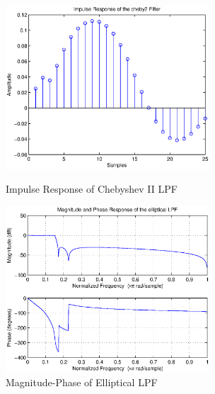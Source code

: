 \documentclass{article}
\begin{document}
\begin{figure}[ht]
\begin{minipage}[b]{0.5\linewidth}
\centering
\includegraphics[width=3in]{project6_09.eps}
\caption{Impulse Response of  Chebyshev II LPF}
\label{fig:figure9}
\end{minipage}
\hspace{0.5cm}
\begin{minipage}[b]{0.5\linewidth}
\centering
\includegraphics[width=3in]{project6_10.eps}
\caption{Magnitude-Phase of  Elliptical LPF}
\label{fig:figure10}
\end{minipage}
\end{figure}
\end{document}
